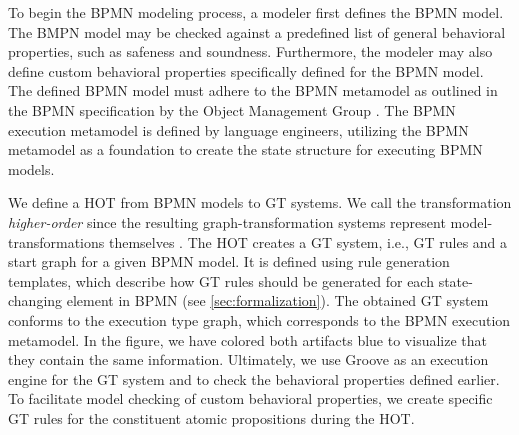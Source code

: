 \documentclass{lmcs} %
\begin{document}
To begin the BPMN modeling process, a modeler first defines the BPMN model. 
The BMPN model may be checked against a predefined list of general behavioral properties, such as safeness and soundness.
Furthermore, the modeler may also define custom behavioral properties specifically defined for the BPMN model.
The defined BPMN model must adhere to the BPMN metamodel as outlined in the BPMN specification by the Object Management Group \cite{objectmanagementgroupBusinessProcessModel2013}.
The BPMN execution metamodel is defined by language engineers, utilizing the BPMN metamodel as a foundation to create the state structure for executing BPMN models. 



We define a HOT from BPMN models to GT systems.
We call the transformation \textit{higher-order} since the resulting graph-transformation systems represent model-transformations themselves \cite{tisiUseHigherOrderModel2009}.
The HOT creates a GT system, i.e., GT rules and a start graph for a given BPMN model.
It is defined using rule generation templates, which describe how GT rules should be generated for each state-changing element in BPMN (see \autoref{sec:formalization}).
The obtained GT system conforms to the execution type graph, which corresponds to the BPMN execution metamodel.
In the figure, we have colored both artifacts blue to visualize that they contain the same information.
Ultimately, we use Groove as an execution engine for the GT system and to check the behavioral properties defined earlier.
To facilitate model checking of custom behavioral properties, we create specific GT rules for the constituent atomic propositions during the HOT.
\end{document}
